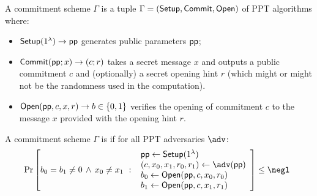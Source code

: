 \begin{definition}
A commitment scheme $\Gamma$ is a tuple $\Gamma = (\textsf{{Setup}}, \textsf{{Commit}}, \textsf{{Open}})$ of PPT algorithms where:
\begin{itemize}
    \item $\textsf{{Setup}}(1^\lambda) \rightarrow \textsf{pp}$ generates public parameters $\textsf{pp}$;
    \item $\textsf{{Commit}}(\textsf{pp}; x) \rightarrow (c; r)$ takes a secret message $x$ and outputs a public commitment $c$ and (optionally) a secret opening hint $r$ (which might or might not be the randomness used in the computation).
    \item $\textsf{{Open}}(\textsf{pp}, c, x, r) \rightarrow b \in \{0, 1\}$ verifies the opening of commitment $c$ to the message $x$ provided with the opening hint $r$. 
\end{itemize}

A commitment scheme $\Gamma$ is  if for all PPT adversaries $\adv$:
\[
    \Pr\left[
        b_0 = b_1 \neq 0 \, \wedge \, x_0 \neq x_1 \ : \
        \begin{array}{l}
             \params \gets \pro{Setup}(1^\lambda) \\
             (c, x_0, x_1, r_0, r_1) \gets \adv(\params) \\
             b_0 \gets \pro{Open}(\params, c, x_0, r_0) \\
             b_1 \gets \pro{Open}(\params, c, x_1, r_1) \\
        \end{array}
    \right] \leq \negl \enspace 
\]

\begin{comment}
A commitment scheme $\Gamma$ is \defn{hiding} if for all probabilistic polynomial time adversaries $\adv=(\adv_0,\adv_1)$,
\[
    \left|
        1 - 2\Pr\left[
            \hat{b} = b \ : \
        \begin{array}{l}
             \params \gets \pro{Setup}(1^\lambda) \\
             (\state, x_0, x_1) \gets \adv_0(\params) \\
             b \sample \{0,1\} \\
             (\gr{C}; *) \gets \pro{Commit}(\params; x_b) \\
             \hat{b} \gets \adv_1(\state, \gr{C})
        \end{array}
        \right]
    \right| \leq \negl \enspace .
\]
\end{comment}
\end{definition}

